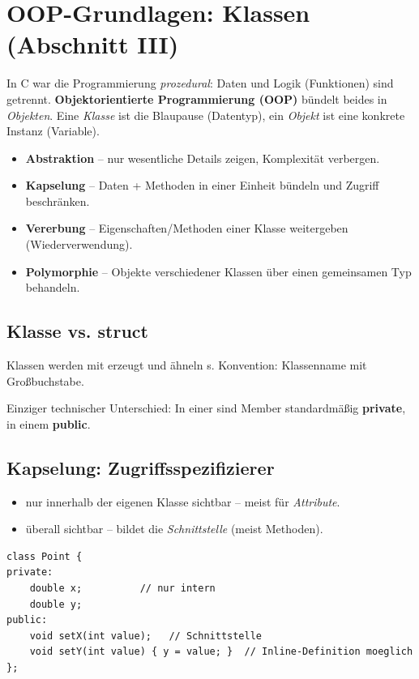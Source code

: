 \section{OOP-Grundlagen: Klassen (Abschnitt III)}
In C war die Programmierung \emph{prozedural}: Daten und Logik (Funktionen) sind getrennt. \textbf{Objektorientierte Programmierung (OOP)} b\"undelt beides in \emph{Objekten}. Eine \emph{Klasse} ist die Blaupause (Datentyp), ein \emph{Objekt} ist eine konkrete Instanz (Variable).

\begin{definition}
\begin{itemize}
  \item \textbf{Abstraktion} -- nur wesentliche Details zeigen, Komplexit\"at verbergen.
  \item \textbf{Kapselung} -- Daten + Methoden in einer Einheit b\"undeln und Zugriff beschr\"anken.
  \item \textbf{Vererbung} -- Eigenschaften/Methoden einer Klasse weitergeben (Wiederverwendung).
  \item \textbf{Polymorphie} -- Objekte verschiedener Klassen \"uber einen gemeinsamen Typ behandeln.
\end{itemize}
\end{definition}

\subsection{Klasse vs. struct}
Klassen werden mit  erzeugt und \"ahneln s. Konvention: Klassenname mit Gro\ss buchstabe.
\begin{merke}
Einziger technischer Unterschied: In einer  sind Member standardm\"a\ss ig \textbf{private}, in einem  \textbf{public}.
\end{merke}

\subsection{Kapselung: Zugriffsspezifizierer}
\begin{itemize}
  \item \textbf{} nur innerhalb der eigenen Klasse sichtbar -- meist f\"ur \emph{Attribute}.
  \item \textbf{} \"uberall sichtbar -- bildet die \emph{Schnittstelle} (meist Methoden).
\end{itemize}
\begin{lstlisting}
class Point {
private:
    double x;          // nur intern
    double y;
public:
    void setX(int value);   // Schnittstelle
    void setY(int value) { y = value; }  // Inline-Definition moeglich
};
\end{lstlisting}

